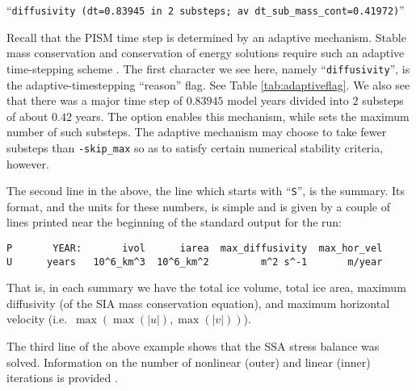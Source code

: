   ``\texttt{diffusivity (dt=0.83945 in 2 substeps; av dt_sub_mass_cont=0.41972)}''

\noindent Recall that the PISM time step is determined by an
adaptive mechanism.  Stable mass conservation and conservation of energy solutions
require such an adaptive time-stepping scheme \cite{BBL}.  The first character
we see here, namely ``\texttt{diffusivity}'', is the adaptive-timestepping ``reason''
flag.  See Table \ref{tab:adaptiveflag}.  We also see that
there was a major time step of $0.83945$ model years divided into $2$ substeps of
about $0.42$ years.  The  option enables this mechanism, while
 sets the maximum number of such substeps.  The adaptive
mechanism may choose to take fewer substeps than \texttt{-skip_max} so as to
satisfy certain numerical stability criteria, however.

The second line in the above, the line which starts with ``\texttt{S}'', is the summary.  Its format, and the units for these numbers, is simple and is given by a couple of lines printed near the beginning of the standard output for the run:
\small
\begin{verbatim}
P       YEAR:       ivol      iarea  max_diffusivity  max_hor_vel
U      years   10^6_km^3  10^6_km^2         m^2 s^-1       m/year
\end{verbatim}
\normalsize
That is, in each summary we have the total ice volume, total ice area, maximum diffusivity (of the SIA mass conservation equation), and maximum horizontal velocity (i.e.~$\max(\max(|u|), \max(|v|))$).

The third line of the above example shows that the SSA stress balance was solved.  Information on the number of nonlinear (outer) and linear (inner) iterations is provided \cite{BBssasliding}.

